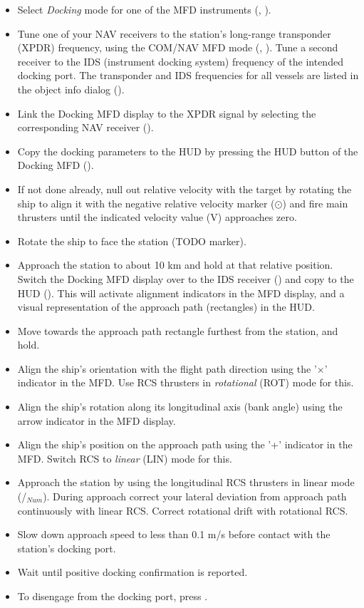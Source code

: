 \documentclass[Orbiter User Manual.tex]{subfiles}
\begin{document}
\begin{itemize}
\item Select \textit{Docking} mode for one of the MFD instruments (\Shift{}, \Shift{}).
\item Tune one of your NAV receivers to the station's long-range transponder (XPDR) frequency, using the COM/NAV MFD mode (\Shift{}, \Shift{}). Tune a second receiver to the IDS (instrument docking system) frequency of the intended docking port. The transponder and IDS frequencies for all vessels are listed in the object info dialog (\Ctrl{}).
\item Link the Docking MFD display to the XPDR signal by selecting the corresponding NAV receiver (\Shift{}).
\item Copy the docking parameters to the HUD by pressing the HUD button of the Docking MFD (\Shift{}).
\item If not done already, null out relative velocity with the target by rotating the ship to align it with the negative relative velocity marker ($\odot$) and fire main thrusters until the indicated velocity value (V) approaches zero.
\item Rotate the ship to face the station (TODO marker).
\item Approach the station to about 10 km and hold at that relative position. Switch the Docking MFD display over to the IDS receiver (\Shift{}) and copy to the HUD (\Shift{}). This will activate alignment indicators in the MFD display, and a visual representation of the approach path (rectangles) in the HUD.
\item Move towards the approach path rectangle furthest from the station, and hold.
\item Align the ship's orientation with the flight path direction using the '$\times$' indicator in the MFD. Use RCS thrusters in \textit{rotational} (ROT) mode for this.
\item Align the ship's rotation along its longitudinal axis (bank angle) using the arrow indicator in the MFD display.
\item Align the ship's position on the approach path using the '+' indicator in the MFD. Switch RCS to \textit{linear} (LIN) mode for this.
\item Approach the station by using the longitudinal RCS thrusters in linear mode (/$_{Num}$). During approach correct your lateral deviation from approach path continuously with linear RCS. Correct rotational drift with rotational RCS.
\item Slow down approach speed to less than 0.1 m/s before contact with the station's docking port.
\item Wait until positive docking confirmation is reported.
\item To disengage from the docking port, press \Ctrl{}.
\end{itemize}
\end{document}
